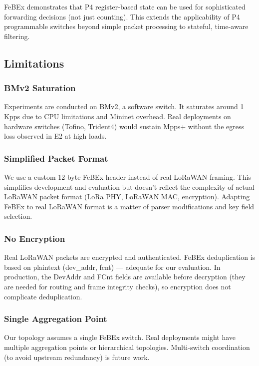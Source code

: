 FeBEx demonstrates that P4 register-based state can be used for sophisticated forwarding decisions (not just counting). This extends the applicability of P4 programmable switches beyond simple packet processing to stateful, time-aware filtering.

\subsection{Limitations}

\subsubsection{BMv2 Saturation}

Experiments are conducted on BMv2, a software switch. It saturates around 1 Kpps due to CPU limitations and Mininet overhead. Real deployments on hardware switches (Tofino, Trident4) would sustain Mpps+ without the egress loss observed in E2 at high loads.

\subsubsection{Simplified Packet Format}

We use a custom 12-byte FeBEx header instead of real LoRaWAN framing. This simplifies development and evaluation but doesn't reflect the complexity of actual LoRaWAN packet format (LoRa PHY, LoRaWAN MAC, encryption). Adapting FeBEx to real LoRaWAN format is a matter of parser modifications and key field selection.

\subsubsection{No Encryption}

Real LoRaWAN packets are encrypted and authenticated. FeBEx deduplication is based on plaintext (dev\_addr, fcnt) — adequate for our evaluation. In production, the DevAddr and FCnt fields are available before decryption (they are needed for routing and frame integrity checks), so encryption does not complicate deduplication.

\subsubsection{Single Aggregation Point}

Our topology assumes a single FeBEx switch. Real deployments might have multiple aggregation points or hierarchical topologies. Multi-switch coordination (to avoid upstream redundancy) is future work.

